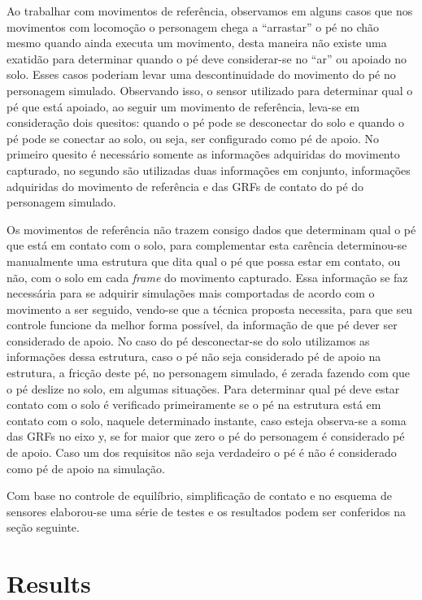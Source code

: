 \documentclass[tog]{acmsiggraph}
\begin{document}
Ao trabalhar com movimentos de referência, observamos em alguns casos que nos movimentos com locomoção o personagem chega a ``arrastar'' o pé no chão mesmo quando ainda executa
um movimento, desta maneira não existe uma exatidão para determinar quando o pé deve considerar-se no ``ar'' ou apoiado no solo. 
Esses casos poderiam levar uma descontinuidade do movimento do pé no personagem simulado. Observando isso, o sensor utilizado para
determinar qual o pé que está apoiado, ao seguir um movimento de referência, leva-se em consideração dois quesitos: quando
o pé pode se desconectar do solo e quando o pé pode se conectar ao solo, ou seja, ser configurado como pé de apoio. No primeiro quesito é necessário somente as informações adquiridas do movimento
capturado, no segundo são utilizadas duas informações em conjunto, informações adquiridas do movimento de referência e das GRFs de contato do pé 
do personagem simulado. 


Os movimentos de referência não trazem consigo dados que determinam qual o pé que está em contato com o solo, para complementar esta carência
determinou-se manualmente uma estrutura que dita qual o pé que possa estar em contato, ou não, com o solo em cada \textit{frame} do movimento capturado.
Essa informação se faz necessária para se adquirir simulações mais comportadas de acordo com o movimento a ser seguido, vendo-se que a técnica
proposta necessita, para que seu controle funcione da melhor forma possível, da informação de que pé dever ser considerado de apoio. No caso do pé desconectar-se do solo 
utilizamos as informações dessa estrutura, caso o pé não seja considerado pé de apoio na estrutura, a fricção deste pé, no personagem simulado, é zerada
fazendo com que o pé deslize no solo, em algumas situações. Para determinar qual pé deve estar contato com o solo é verificado primeiramente se o pé na estrutura
está em contato com o solo, naquele determinado instante, caso esteja observa-se a soma das GRFs no eixo y, se for maior que zero o pé do
personagem é considerado pé de apoio. Caso um dos requisitos não seja verdadeiro o pé é não é considerado como pé de apoio na simulação.


Com base no controle de equilíbrio, simplificação de contato e no esquema de sensores elaborou-se uma série de testes e os resultados podem ser conferidos na seção seguinte.


\section{Results}
\end{document}
